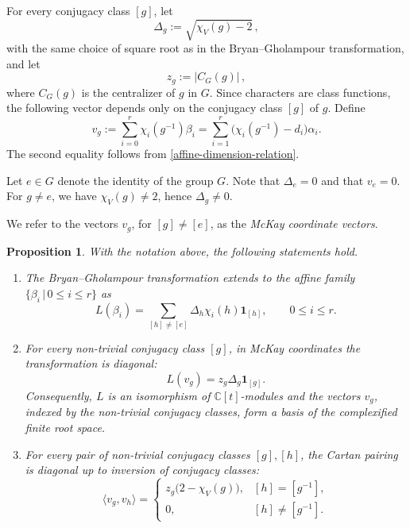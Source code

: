 \documentclass[a4paper,reqno]{amsart}
\theoremstyle{plain} %
\newtheorem{prop}[thm]{Proposition}
\theoremstyle{definition} %
\theoremstyle{remark} %
\newcommand{\C}{\mathbb{C}}
\newcommand{\fo}{\mathbf{1}}
\newcommand{\1}{\mathds{1}}   %
\begin{document}
For every  conjugacy class $[g]$, let 
\[
\Delta_g :=\sqrt{\chi_V(g)-2} \, ,
\]
with the same choice of square root as in the Bryan--Gholampour
transformation, and let
\[
z_g :=|C_G(g)| \, ,
\] 
where $C_G(g)$ is the centralizer of $g$ in $G$. 
Since characters are class functions, the following vector depends only on the
conjugacy class $[g]$ of $g$. Define 
\begin{equation}\label{def:mckay-coordinate}
v_g:=\sum_{i=0}^r \chi_i(g^{-1})\beta_i
=\sum_{i=1}^r\bigl(\chi_i(g^{-1})-d_i\bigr)\alpha_i.
\end{equation}
The second equality follows from \eqref{affine-dimension-relation}. 

Let $e\in G$ denote the identity of the group $G$. Note that $\Delta_e=0$ and that $v_e=0$. 
For $g\not= e$, we have  $\chi_V(g) \not= 2$, hence $\Delta_g \not= 0$. 

We refer to the vectors $v_g$, for $[g]\ne[e]$, as the \textit{McKay coordinate
vectors}.

\begin{prop}\label{prop:mckay-coordinates}
With the notation above, the following statements hold.
\begin{enumerate}
\item[(i)] The Bryan--Gholampour transformation extends to the affine family $\{ \beta_i \, | \, 0\leq i\leq r \}$ as
\begin{equation}\label{BG-affine-family}
L(\beta_i)=\sum_{[h]\neq[e]}\Delta_h\chi_i(h)\fo_{[h]},
\qquad 0\leq i\leq r.
\end{equation}
\item[(ii)] For every non-trivial conjugacy class $[g]$, in McKay coordinates the transformation is diagonal:
\begin{equation}\label{BG-diagonal-general}
L(v_g)=z_g\Delta_g\fo_{[g]}.
\end{equation}
Consequently, $L$ is an isomorphism of $\C[t]$-modules and the vectors $v_g$, indexed by the non-trivial conjugacy classes,
form a basis of the complexified finite root space.
\item[(iii)] For every pair of non-trivial conjugacy classes $[g],[h]$, the Cartan pairing is diagonal up to inversion of conjugacy
classes:
\begin{equation}\label{mckay-pairing-general}
\langle v_g,v_h\rangle=
\begin{cases}
z_g\bigl(2-\chi_V(g)\bigr),& [h]=[g^{-1}],\\
0,& [h]\neq[g^{-1}].
\end{cases}
\end{equation}
\end{enumerate}
\end{prop}
\end{document}
